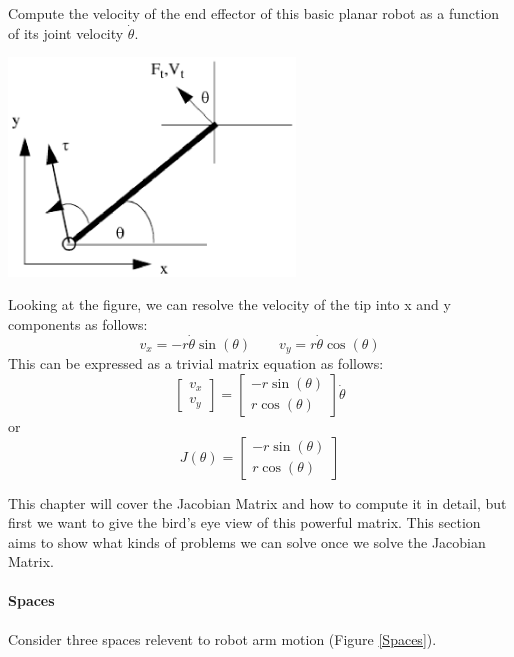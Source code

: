 \begin{Example}
Compute the velocity of the end effector of this basic planar robot as a function of its joint velocity $\dot{\theta}$.

\includegraphics[width=3.0in]{figs05/planar_examp.eps}

Looking at the figure, we can resolve the velocity of the tip into x and y components as follows:
\[
v_x = -r\dot{\theta}\sin(\theta)  \qquad   v_y = r\dot{\theta}\cos(\theta)
\]
This can be expressed as a trivial matrix equation as follows:
\[
\left [ \begin{array}{c}
v_x \\ v_y
\end{array} \right ]
=
\left [ \begin{array}{c}
-r\sin(\theta) \\ r\cos(\theta)
\end{array} \right ]
\dot{\theta}
\]
or
\[
J(\theta) =
\left [ \begin{array}{c}
-r\sin(\theta) \\ r\cos(\theta)
\end{array} \right ]
\]

\end{Example}


This chapter will cover the Jacobian Matrix and how to compute it in detail, but first we want to give
the bird's eye view of this powerful matrix.  This section aims to show what kinds of problems
we can solve once we solve the Jacobian Matrix.


\paragraph{Spaces}

Consider three spaces relevent to robot arm motion (Figure \ref{Spaces}).

